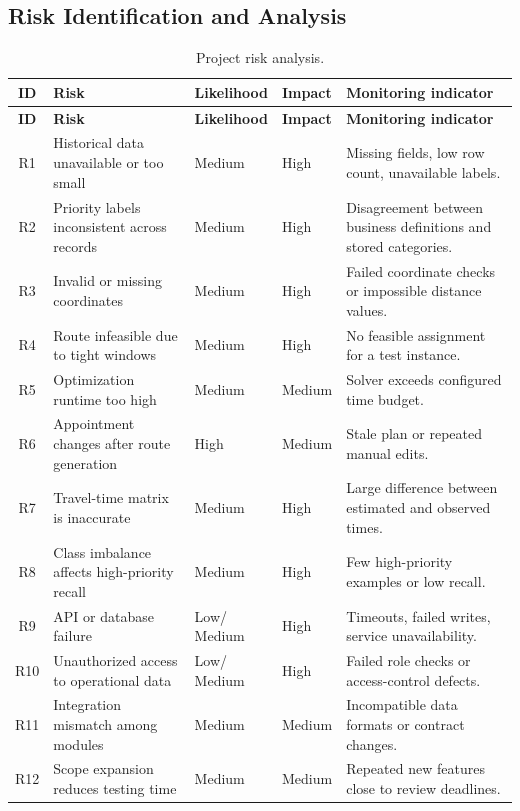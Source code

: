 \documentclass[12pt,a4paper,oneside]{report}
\begin{document}
\subsection{Risk Identification and Analysis}
\begin{longtable}{c >{\RaggedRight\arraybackslash}p{39mm} >{\RaggedRight\arraybackslash}p{20mm} >{\RaggedRight\arraybackslash}p{20mm} >{\RaggedRight\arraybackslash}p{35mm}}
\caption{Project risk analysis.}\label{tab:risk-analysis}\\
\toprule
\textbf{ID} & \textbf{Risk} & \textbf{Likelihood} & \textbf{Impact} & \textbf{Monitoring indicator}\\
\midrule
\endfirsthead
\toprule
\textbf{ID} & \textbf{Risk} & \textbf{Likelihood} & \textbf{Impact} & \textbf{Monitoring indicator}\\
\midrule
\endhead
R1 & Historical data unavailable or too small & Medium & High & Missing fields, low row count, unavailable labels.\\
R2 & Priority labels inconsistent across records & Medium & High & Disagreement between business definitions and stored categories.\\
R3 & Invalid or missing coordinates & Medium & High & Failed coordinate checks or impossible distance values.\\
R4 & Route infeasible due to tight windows & Medium & High & No feasible assignment for a test instance.\\
R5 & Optimization runtime too high & Medium & Medium & Solver exceeds configured time budget.\\
R6 & Appointment changes after route generation & High & Medium & Stale plan or repeated manual edits.\\
R7 & Travel-time matrix is inaccurate & Medium & High & Large difference between estimated and observed times.\\
R8 & Class imbalance affects high-priority recall & Medium & High & Few high-priority examples or low recall.\\
R9 & API or database failure & \shortstack[l]{Low/\\Medium} & High & Timeouts, failed writes, service unavailability.\\
R10 & Unauthorized access to operational data & \shortstack[l]{Low/\\Medium} & High & Failed role checks or access-control defects.\\
R11 & Integration mismatch among modules & Medium & Medium & Incompatible data formats or contract changes.\\
R12 & Scope expansion reduces testing time & Medium & Medium & Repeated new features close to review deadlines.\\
\bottomrule
\end{longtable}
\end{document}
